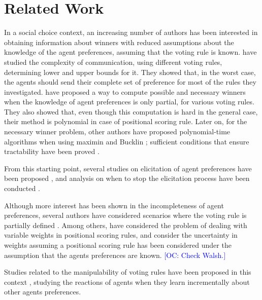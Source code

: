 \documentclass[sigconf, anonymous]{aamas}
\newcommand{\commentOC}[1]{\textcolor{blue}{\small$\big[$OC: #1$\big]$}}
\begin{document}
\section{Related Work}
\label{sec:related}
In a social choice context, an increasing number of authors has been interested in obtaining information about winners with reduced assumptions about the knowledge of the agent preferences, assuming that the voting rule is known.  have studied the complexity of communication, using different voting rules, determining lower and upper bounds for it. They showed that, in the worst case, the agents should send their complete set of preference for most of the rules they investigated.  have proposed a way to compute possible and necessary winners when the knowledge of agent preferences is only partial, for various voting rules. They also showed that, even though this computation is hard in the general case, their method is polynomial in case of positional scoring rule. Later on, for the necessary winner problem, other authors have proposed polynomial-time algorithms when using maximin and Bucklin \citep{Xia2008}; sufficient conditions that ensure tractability have been proved \citep{Pini2007}.

From this starting point, several studies on elicitation of agent preferences have been proposed \citep{Naamani-Dery2015,Kalech2011,Lu2011,Pini2009,Benabbou2016,Cailloux2014,Dey2016,Dey2016_2}, and analysis on when to stop the elicitation process have been conducted \citep{Walsh2009,Conitzer2009}.

Although more interest has been shown in the incompleteness of agent preferences, several authors have considered scenarios where the voting rule is partially defined \citep{Stein1994}. Among others, \citet{Llamazares2013} have considered the problem of dealing with variable weights in positional scoring rules, and \citet{Walsh2007, Viappiani2018} consider the uncertainty in weights assuming a positional scoring rule has been considered under the assumption that the agents preferences are known. \commentOC{Check Walsh.}

Studies related to the manipulability of voting rules have been proposed in this context \citep{Endriss2016,Dey2018,Dey2018_2}, studying the reactions of agents when they learn incrementally about other agents preferences.
\end{document}
